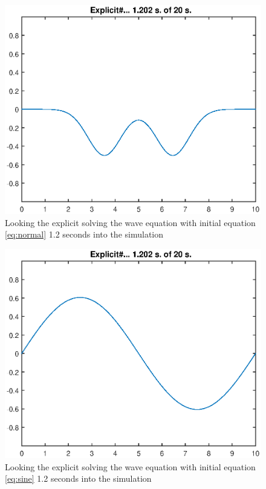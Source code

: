 \documentclass[11pt]{article}
\begin{document}
\begin{figure}[H]
	\centering
	\includegraphics[width=1\textwidth]{../explicitNormal}
	\caption{Looking the explicit solving the wave equation with initial equation 
	\ref{eq:normal} 1.2 seconds into the simulation}
	\label{fig:explicitNormal}
\end{figure}
\begin{figure}[H]
	\centering
	\includegraphics[width=1\textwidth]{../explicitSine}
	\caption{Looking the explicit solving the wave equation with initial equation 
	\ref{eq:sine} 1.2 seconds into the simulation}
	\label{fig:explicitSine}
\end{figure}
\end{document}
